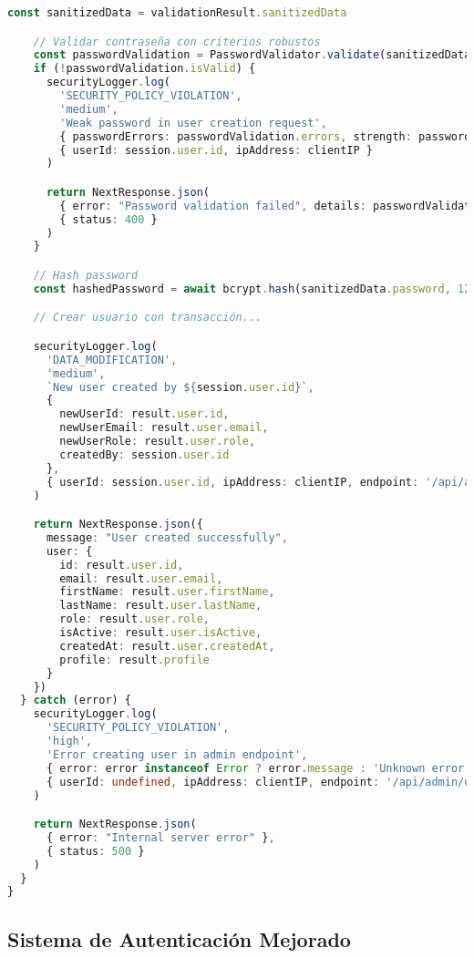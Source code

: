 \documentclass[12pt,a4paper]{article}
\begin{document}
\begin{lstlisting}[language=TypeScript, caption=API con Seguridad Integrada]
    const sanitizedData = validationResult.sanitizedData

    // Validar contraseña con criterios robustos
    const passwordValidation = PasswordValidator.validate(sanitizedData.password)
    if (!passwordValidation.isValid) {
      securityLogger.log(
        'SECURITY_POLICY_VIOLATION',
        'medium',
        'Weak password in user creation request',
        { passwordErrors: passwordValidation.errors, strength: passwordValidation.strength },
        { userId: session.user.id, ipAddress: clientIP }
      )

      return NextResponse.json(
        { error: "Password validation failed", details: passwordValidation.errors },
        { status: 400 }
      )
    }

    // Hash password
    const hashedPassword = await bcrypt.hash(sanitizedData.password, 12)

    // Crear usuario con transacción...

    securityLogger.log(
      'DATA_MODIFICATION',
      'medium',
      `New user created by ${session.user.id}`,
      {
        newUserId: result.user.id,
        newUserEmail: result.user.email,
        newUserRole: result.user.role,
        createdBy: session.user.id
      },
      { userId: session.user.id, ipAddress: clientIP, endpoint: '/api/admin/users' }
    )

    return NextResponse.json({
      message: "User created successfully",
      user: {
        id: result.user.id,
        email: result.user.email,
        firstName: result.user.firstName,
        lastName: result.user.lastName,
        role: result.user.role,
        isActive: result.user.isActive,
        createdAt: result.user.createdAt,
        profile: result.profile
      }
    })
  } catch (error) {
    securityLogger.log(
      'SECURITY_POLICY_VIOLATION',
      'high',
      'Error creating user in admin endpoint',
      { error: error instanceof Error ? error.message : 'Unknown error' },
      { userId: undefined, ipAddress: clientIP, endpoint: '/api/admin/users' }
    )

    return NextResponse.json(
      { error: "Internal server error" },
      { status: 500 }
    )
  }
}
\end{lstlisting}

\subsection{Sistema de Autenticación Mejorado}
\end{document}
